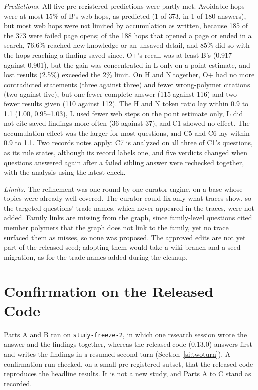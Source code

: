 \documentclass[journal=mamobx,manuscript=suppinfo]{achemso}
\newcommand{\code}[1]{\texttt{#1}}
\begin{document}
\emph{Predictions.}
All five pre-registered predictions were partly met.
Avoidable hops were at most 15\% of B's web hops, as predicted (1 of 373, in 1 of 180 answers), but most web hops were not limited by accumulation as written, because 185 of the 373 were failed page opens; of the 188 hops that opened a page or ended in a search, 76.6\% reached new knowledge or an unsaved detail, and 85\% did so with the hops reaching a finding saved since.
O+'s recall was at least B's (0.917 against 0.901), but the gain was concentrated in L only on a point estimate, and lost results (2.5\%) exceeded the 2\% limit.
On H and N together, O+ had no more contradicted statements (three against three) and fewer wrong-polymer citations (two against five), but one fewer complete answer (115 against 116) and two fewer results given (110 against 112).
The H and N token ratio lay within 0.9 to 1.1 (1.00, 0.95--1.03), L used fewer web steps on the point estimate only, L did not cite saved findings more often (36 against 37), and C1 showed no effect.
The accumulation effect was the larger for most questions, and C5 and C6 lay within 0.9 to 1.1.
Two records notes apply: C7 is analyzed on all three of C1's questions, as its rule states, although its record labels one, and five verdicts changed when questions answered again after a failed sibling answer were rechecked together, with the analysis using the latest check.

\emph{Limits.}
The refinement was one round by one curator engine, on a base whose topics were already well covered.
The curator could fix only what traces show, so the targeted questions' trade names, which never appeared in the traces, were not added.
Family links are missing from the graph, since family-level questions cited member polymers that the graph does not link to the family, yet no trace surfaced them as misses, so none was proposed.
The approved edits are not yet part of the released seed; adopting them would take a wiki branch and a seed migration, as for the trade names added during the cleanup.

\section{Confirmation on the Released Code}
\label{si:confirm}

Parts A and B ran on \code{study-freeze-2}, in which one research session wrote the answer and the findings together, whereas the released code (0.13.0) answers first and writes the findings in a resumed second turn (Section~\ref{si:twoturn}).
A confirmation run checked, on a small pre-registered subset, that the released code reproduces the headline results.
It is not a new study, and Parts A to C stand as recorded.
\end{document}

